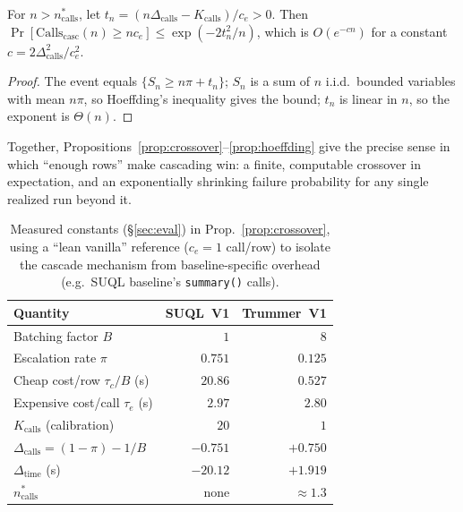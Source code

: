 \documentclass[sigconf,natbib=false]{acmart}
\begin{document}
\begin{proposition}
\label{prop:hoeffding}
For $n>n^\ast_{\mathrm{calls}}$, let $t_n=(n\Delta_{\mathrm{calls}}-K_{\mathrm{calls}})/c_e>0$. Then
$\Pr[\mathrm{Calls}_{\mathrm{casc}}(n)\ge nc_e] \le \exp(-2t_n^2/n)$, which is $O(e^{-cn})$ for a constant $c=2\Delta_{\mathrm{calls}}^2/c_e^2$.
\end{proposition}
\begin{proof}
The event equals $\{S_n \ge n\pi+t_n\}$; $S_n$ is a sum of $n$ i.i.d.\ bounded variables with mean $n\pi$, so Hoeffding's inequality gives the bound; $t_n$ is linear in $n$, so the exponent is $\Theta(n)$.
\end{proof}

Together, Propositions~\ref{prop:crossover}--\ref{prop:hoeffding} give the precise sense in which ``enough rows'' make cascading win: a finite, computable crossover in expectation, and an exponentially shrinking failure probability for any single realized run beyond it.

\begin{table}[t]
\centering\scriptsize
\begin{tabular}{lrr}
\toprule
Quantity & SUQL~V1 & Trummer~V1 \\
\midrule
Batching factor $B$ & $1$ & $8$ \\
Escalation rate $\pi$ & $0.751$ & $0.125$ \\
Cheap cost/row $\tau_c/B$ (s) & $20.86$ & $0.527$ \\
Expensive cost/call $\tau_e$ (s) & $2.97$ & $2.80$ \\
$K_{\mathrm{calls}}$ (calibration) & $20$ & $1$ \\
$\Delta_{\mathrm{calls}}=(1-\pi)-1/B$ & $-0.751$ & $+0.750$ \\
$\Delta_{\mathrm{time}}$ (s) & $-20.12$ & $+1.919$ \\
$n^\ast_{\mathrm{calls}}$ & none & $\approx 1.3$ \\
\bottomrule
\end{tabular}
\caption{Measured constants (\S\ref{sec:eval}) in Prop.~\ref{prop:crossover}, using a ``lean vanilla'' reference ($c_e{=}1$ call/row) to isolate the cascade mechanism from baseline-specific overhead (e.g.\ SUQL baseline's \texttt{summary()} calls).}
\label{tab:theory-constants}
\end{table}
\end{document}
